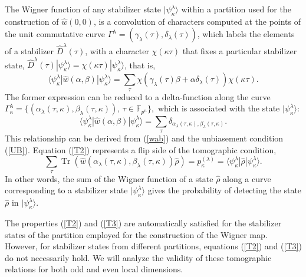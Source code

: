 \documentclass{article}
\DeclareMathOperator{\Tr}{Tr}
\begin{document}
The Wigner function of any stabilizer state $|\psi_{\kappa }^{\lambda}\rangle$
within a partition used for the construction of $\hat{w}\left(0,0\right)$, is a
convolution of characters computed at the points of the unit commutative curve
$\Gamma^{\lambda} = \left(\gamma_{\lambda}\left(\tau \right),
\delta_{\lambda}(\tau)\right)$, which labels the elements of a stabilizer
$\hat{D}^{\lambda}(\tau)$, with a character $\chi(\kappa \tau)$ that fixes a
particular stabilizer state, $\hat{D}^{\lambda}(\tau)|\psi_{\kappa
}^{\lambda}\rangle = \chi(\kappa \tau )|\psi_{\kappa}^{\lambda }\rangle$, that
is,
\begin{equation}
  \langle \psi_{\kappa }^{\lambda }
  |\hat{w}\left(\alpha,\beta\right)
  |\psi_{\kappa }^{\lambda }\rangle
  = \sum_{\tau } \chi\left(
    \gamma_{\lambda}(\tau) \beta + \alpha \delta_{\lambda}(\tau)
  \right)
  \chi(\kappa \tau).
  \label{T1}
\end{equation}
The former expression can be reduced to a delta-function along the curve
$\Gamma_{\kappa}^{\lambda} = \{(\alpha_{\lambda}(\tau,\kappa),
\beta_{\lambda}(\tau,\kappa)), \, \tau \in \mathbb{F}_{p^{n}}\},$ which is
associated with the state $|\psi_{\kappa}^{\lambda}\rangle$:
\begin{equation}
  \langle \psi_{\kappa }^{\lambda }
  |\hat{w}\left(\alpha,\beta\right)
  |\psi_{\kappa}^{\lambda}\rangle
  = \sum_{\tau}
  \delta_{\alpha_{\lambda}(\tau,\kappa), \beta_{\lambda}(\tau,\kappa )}.
  \label{T2}
\end{equation}
This relationship can be derived from (\ref{wab}) and the unbiasement
condition (\ref{UB}). Equation (\ref{T2}) represents a flip side of the
tomographic condition, 
\begin{equation}
  \sum_{\tau } \Tr\left(
    \hat{w}\left(
      \alpha_{\lambda}(\tau,\kappa),\beta_{\lambda}(\tau,\kappa)
    \right)
    \hat{\rho}
  \right)
  = p_{\kappa}^{(\lambda)} = \langle \psi_{\kappa}^{\lambda}
  |\hat{\rho}|\psi_{\kappa}^{\lambda}\rangle.
  \label{T3}
\end{equation}
In other words, the sum of the Wigner function of a state $\hat{\rho}$ along a
curve corresponding to a stabilizer state $|\psi _{\kappa }^{\lambda }\rangle$
gives the probability of detecting the state $\hat{\rho}$ in $|\psi_{\kappa
}^{\lambda}\rangle$.

The properties (\ref{T2}) and (\ref{T3}) are automatically satisfied for the
stabilizer states of the partition employed for the construction of the Wigner
map. However, for stabilizer states from different partitions, equations
(\ref{T2}) and (\ref{T3}) do not necessarily hold. We will analyze the validity
of these tomographic relations for both odd and even local dimensions.
\end{document}
